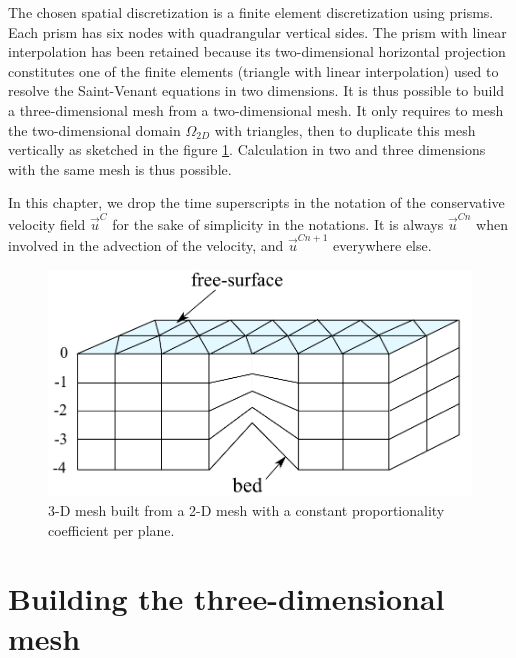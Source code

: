 The chosen spatial discretization is a finite element discretization using
prisms. Each prism has six nodes with quadrangular
vertical sides. The prism with linear interpolation has been retained because its two-dimensional
horizontal projection constitutes one of the finite elements (triangle with
linear interpolation) used to resolve the Saint-Venant equations in two
dimensions. It is thus possible to build a three-dimensional mesh from a
two-dimensional mesh. It only requires to mesh the two-dimensional domain
$\Omega_{2D}$ with triangles, then to duplicate this mesh vertically as
sketched in the figure \ref{maillage 3D 1}.
Calculation in two and three dimensions with the same mesh is thus possible.

In this chapter, we drop the time superscripts in the notation of the
conservative velocity field $\vec{u}^C$ for the sake of simplicity in the notations.
It is always $\vec{u}^{Cn}$ when involved in the advection of the velocity,
and $\vec{u}^{Cn+1}$ everywhere else.

\begin{figure}[tbh]%
\centering
\includegraphics[scale=0.5]{graphics/classical_mesh.pdf}%
\caption{3-D mesh built from a 2-D mesh with a constant proportionality coefficient per plane.}%
\label{maillage 3D 1}%
\end{figure}


\section{\label{maillage 3D}Building the three-dimensional mesh}

